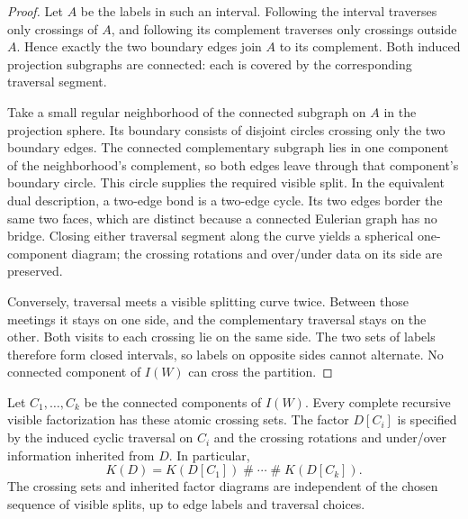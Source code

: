 \begin{proof}
Let $A$ be the labels in such an interval.  Following the interval traverses
only crossings of $A$, and following its complement traverses only crossings
outside $A$.  Hence exactly the two boundary edges join $A$ to its
complement.  Both induced projection subgraphs are connected: each is
covered by the corresponding traversal segment.

Take a small regular neighborhood of the connected subgraph on $A$ in the
projection sphere.  Its boundary consists of disjoint circles crossing
only the two boundary edges.  The connected complementary subgraph lies
in one component of the neighborhood's complement, so both edges leave
through that component's boundary circle.  This circle supplies the
required visible split.  In the equivalent dual description, a two-edge
bond is a two-edge cycle.  Its two edges border the same two faces, which
are distinct because a connected Eulerian graph has no bridge.
Closing either traversal segment along the curve yields
a spherical one-component diagram; the crossing rotations and over/under
data on its side are preserved.

Conversely, traversal meets a visible splitting curve twice.  Between those
meetings it stays on one side, and the complementary traversal stays on the
other.  Both visits to each crossing lie on the same side.  The two sets of
labels therefore form closed intervals, so labels on opposite sides cannot
alternate.  No connected component of $I(W)$ can cross the partition.
\end{proof}

\begin{theorem}
\label{thm:interlace-factors}
Let $C_1,\ldots,C_k$ be the connected components of $I(W)$.  Every complete
recursive visible factorization has these atomic crossing sets.  The factor
$D[C_i]$ is specified by the induced cyclic traversal on $C_i$ and the
crossing rotations and under/over information inherited from $D$.  In
particular,
\begin{equation}
\label{eq:interlace-connected-sum}
K(D)=K(D[C_1])\mathbin{\#}\cdots\mathbin{\#}K(D[C_k]).
\end{equation}
The crossing sets and inherited factor diagrams are independent of the
chosen sequence of visible splits, up to edge labels and traversal choices.
\end{theorem}

